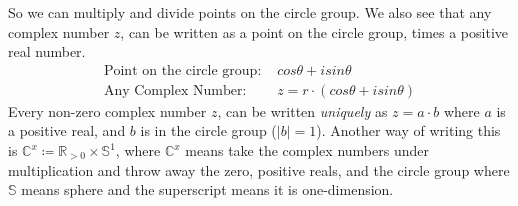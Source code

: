 \documentclass{article}
\begin{document}
So we can multiply and divide points on the circle group. We also see that
any complex number $z$, can be written as a point on the circle group,
times a positive real number.
\begin{align*}
	\text{Point on the circle group: } & cos\theta + isin\theta               \\
	\text{Any Complex Number: }        & z = r \cdot (cos\theta + isin\theta)
\end{align*}
Every non-zero complex number $z$, can be written \textit{uniquely} as
$z = a \cdot b$ where $a$ is a positive real, and $b$ is in the circle group ($|b| = 1$).
Another way of writing this is $\mathbb{C}^{x} \coloneqq \mathbb{R}_{>0} \times \mathbb{S}^{1}$, where
$\mathbb{C}^{x}$ means take the complex numbers under multiplication and throw away the zero, positive
reals, and the circle group where $\mathbb{S}$ means sphere and the superscript means it is one-dimension.
\end{document}
